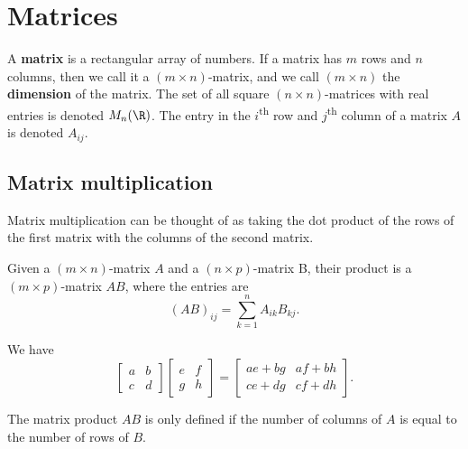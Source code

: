 \section{Matrices}
A \textbf{matrix} is a rectangular array of numbers. If a matrix has $m$ rows and $n$ columns, then we call it a $(m\times n)$-matrix, and we call $(m\times n)$ the \textbf{dimension} of the matrix. The set of all square $(n\times n)$-matrices with real entries is denoted $M_{n}(\R)$. The entry in the $i$\textsuperscript{th} row and $j$\textsuperscript{th} column of a matrix $A$ is denoted $A_{ij}$.
\subsection{Matrix multiplication}
Matrix multiplication can be thought of as taking the dot product of the rows of the first matrix with the columns of the second matrix.
\begin{definition}
  Given a $(m\times n)$-matrix $A$ and a $(n\times p)$-matrix B, their product is a $(m\times p)$-matrix $AB$, where the entries are \[
    (AB)_{ij} = \sum_{k=1}^{n} A_{ik}B_{kj}
  .\] 
\end{definition}
\begin{example}
  We have 
  \begin{equation*}
    \begin{bmatrix}
      a & b \\ c & d
    \end{bmatrix}
    \begin{bmatrix}
      e & f \\ g & h
    \end{bmatrix}
    = 
    \begin{bmatrix}
      ae + bg & af + bh \\ ce + dg & cf + dh
    \end{bmatrix}.
  \end{equation*}
\end{example}
\begin{remark}
  The matrix product $AB$ is only defined if the number of columns of $A$ is equal to the number of rows of $B$.
\end{remark}
